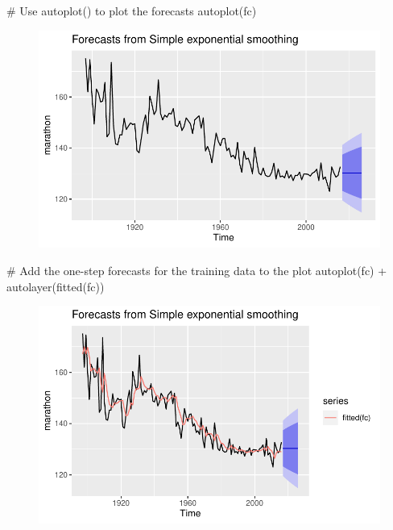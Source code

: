 \documentclass[
  letterpaper,
  DIV=11,
  numbers=noendperiod]{scrartcl}
\newenvironment{Shaded}{\begin{snugshade}}{\end{snugshade}}
\newcommand{\CommentTok}[1]{\textcolor[rgb]{0.37,0.37,0.37}{#1}}
\newcommand{\FunctionTok}[1]{\textcolor[rgb]{0.28,0.35,0.67}{#1}}
\newcommand{\NormalTok}[1]{\textcolor[rgb]{0.00,0.23,0.31}{#1}}
\newcommand{\SpecialCharTok}[1]{\textcolor[rgb]{0.37,0.37,0.37}{#1}}
\begin{document}
\begin{Shaded}
\begin{Highlighting}[]
\CommentTok{\# Use autoplot() to plot the forecasts}
\FunctionTok{autoplot}\NormalTok{(fc)}
\end{Highlighting}
\end{Shaded}

\begin{figure}[H]

{\centering \includegraphics{forecasting_datacamp_ex_files/figure-pdf/unnamed-chunk-12-1.pdf}

}

\end{figure}

\begin{Shaded}
\begin{Highlighting}[]
\CommentTok{\# Add the one{-}step forecasts for the training data to the plot}
\FunctionTok{autoplot}\NormalTok{(fc) }\SpecialCharTok{+} \FunctionTok{autolayer}\NormalTok{(}\FunctionTok{fitted}\NormalTok{(fc))}
\end{Highlighting}
\end{Shaded}

\begin{figure}[H]

{\centering \includegraphics{forecasting_datacamp_ex_files/figure-pdf/unnamed-chunk-12-2.pdf}

}

\end{figure}
\end{document}
